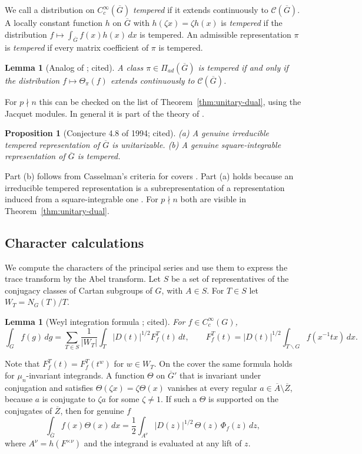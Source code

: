 \documentclass[12pt,letterpaper]{article}
\numberwithin{equation}{section}
\newtheorem{proposition}[theorem]{Proposition}
\newtheorem{lemma}[theorem]{Lemma}
\theoremstyle{definition}
\newcommand{\cited}{cited}
\newcommand{\bG}{\overline{G}}
\newcommand{\bA}{\overline{A}}
\newcommand{\bZ}{\overline{Z}}
\newcommand{\calC}{\mathcal C}
\newcommand{\Pia}{\Pi_{ad}(\bG)}
\begin{document}
We call a distribution on $C_c^\infty(\bG)$ \emph{tempered} if it extends continuously to
$\calC(\bG)$.  A locally constant function $h$ on $\bG$ with $h(\zeta x)=\zeta h(x)$ is
\emph{tempered} if the distribution $f\mapsto\int_{\bG}f(x)h(x)\,dx$ is tempered.  An
admissible representation $\pi$ is \emph{tempered} if every matrix coefficient of $\pi$ is
tempered.

\begin{lemma}[Analog of {\cite[Lemma~4.5.2]{Si79}}; \cited]\label{lem:tempered-char}
A class $\pi\in\Pia$ is tempered if and only if the distribution $f\mapsto\Theta_\pi(f)$
extends continuously to $\calC(\bG)$.
\end{lemma}
For $p\nmid n$ this can be checked on the list of Theorem~\ref{thm:unitary-dual}, using
the Jacquet modules.  In general it is part of the theory of \cite[\S2]{Li12}.

\begin{proposition}[Conjecture 4.8 of 1994; \cited]\label{prop:temp-unitary}
(a) A genuine irreducible tempered representation of $\bG$ is unitarizable.
(b) A genuine square-integrable representation of $\bG$ is tempered.
\end{proposition}
Part (b) follows from Casselman's criteria for covers \cite{BJ13}.  Part (a) holds because
an irreducible tempered representation is a subrepresentation of a representation induced
from a square-integrable one \cite[\S2]{Li12}.  For $p\nmid n$ both are visible in
Theorem~\ref{thm:unitary-dual}.

\subsection{Character calculations}\label{subsec:characters}

We compute the characters of the principal series and use them to express the trace
transform by the Abel transform.  Let $S$ be a set of representatives of the conjugacy
classes of Cartan subgroups of $G$, with $A\in S$.  For $T\in S$ let $W_T=N_G(T)/T$.

\begin{lemma}[Weyl integration formula {\cite[p.~198]{Si79}}; \cited]\label{lem:weyl-int}
For $f\in C_c^\infty(G)$,
\[
\int_Gf(g)\,dg=\sum_{T\in S}\frac1{|W_T|}\int_T|D(t)|^{1/2}F_f^T(t)\,dt,\qquad
F_f^T(t)=|D(t)|^{1/2}\int_{T\backslash G}f(x^{-1}tx)\,dx .
\]
\end{lemma}
Note that $F_f^T(t)=F_f^T(t^w)$ for $w\in W_T$.  On the cover the same formula holds for
$\mu_n$-invariant integrands.  A function $\Theta$ on $\bG'$ that is invariant under
conjugation and satisfies $\Theta(\zeta x)=\zeta\Theta(x)$ vanishes at every regular
$a\in\bA\setminus\bZ$, because $a$ is conjugate to $\zeta a$ for some $\zeta\ne1$.  If such
a $\Theta$ is supported on the conjugates of $\bZ$, then for genuine $f$
\begin{equation}\label{eq:weyl-cover}
\int_{\bG}f(x)\Theta(x)\,dx=\frac12\int_{A^\nu}|D(z)|^{1/2}\,\Theta(z)\,\Phi_f(z)\,dz,
\end{equation}
where $A^\nu=h(F^{\times\nu})$ and the integrand is evaluated at any lift of $z$.
\end{document}
